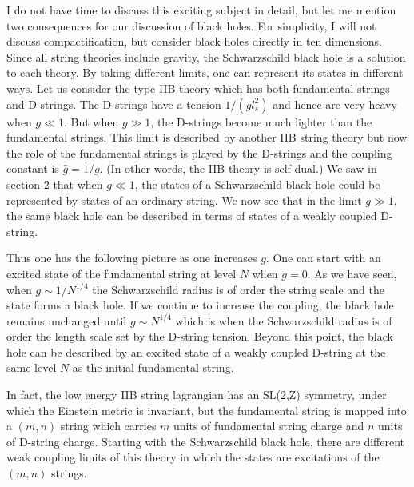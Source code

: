 \documentclass[12pt]{article}
\begin{document}
I do not have time to discuss this exciting subject in detail,
but let me mention two consequences for our discussion of black holes.
For simplicity, I will not discuss compactification, but consider
black holes directly in ten dimensions.
Since all string theories include gravity, the Schwarzschild black hole
is a solution to each theory.  By taking different limits, one can
represent its states in different ways.
Let us consider the type IIB theory 
which has both fundamental strings and
D-strings. The D-strings have a tension $1/(g l_s^2)$ and hence are very heavy 
when $g \ll 1$. But when $g\gg 1$, the D-strings become  much lighter
than the fundamental strings. This limit is described by another
IIB string theory but now the role of the fundamental strings is played by
the D-strings and the coupling constant is $\hat g = 1/g$. (In other words,
the IIB theory is self-dual.) We saw in section 2 that when $g \ll 1$,
the states of a Schwarzschild black hole could be represented by states
of an ordinary string. We now see that
in the limit $g \gg 1$,  the same black hole can be described in terms of
states of a weakly coupled D-string. 

Thus one has the following picture as one increases $g$.
One can start with an excited state of the fundamental string at level $N$
when $g=0$.
As we have seen, when $g\sim 1/N^{1/4}$
the Schwarzschild radius is of order the string scale and
the state forms a black hole. If we continue to increase the coupling,
the black hole remains unchanged  until
$g \sim N^{1/4}$ which is when the Schwarzschild radius is of order the
length scale set by the D-string tension. Beyond this point,
the black hole can be described by an excited state of 
a weakly coupled D-string at the same level $N$ as the initial fundamental
string. 

In fact, the low energy IIB string lagrangian
has an SL(2,Z) symmetry, under which the Einstein metric is invariant,
but the fundamental string is mapped into a $(m,n)$ string which carries
$m$ units of fundamental string charge and $n$ units of D-string charge.
Starting with the Schwarzschild black hole, there are different weak
coupling limits of this theory in which the states are excitations of the
$(m,n)$ strings.
\end{document}
